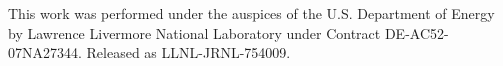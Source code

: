 This work was performed under the auspices of the U.S. Department of Energy by
Lawrence Livermore National Laboratory under Contract DE-AC52-07NA27344.
Released as LLNL-JRNL-754009.

